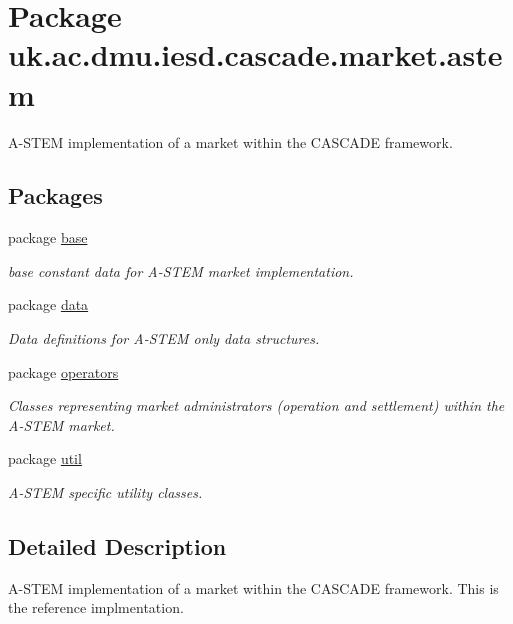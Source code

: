 \hypertarget{namespaceuk_1_1ac_1_1dmu_1_1iesd_1_1cascade_1_1market_1_1astem}{\section{Package uk.\-ac.\-dmu.\-iesd.\-cascade.\-market.\-astem}
\label{namespaceuk_1_1ac_1_1dmu_1_1iesd_1_1cascade_1_1market_1_1astem}
}


A-\/\-S\-T\-E\-M implementation of a market within the C\-A\-S\-C\-A\-D\-E framework.  


\subsection*{Packages}
\begin{DoxyCompactItemize}
\item 
package \hyperlink{namespaceuk_1_1ac_1_1dmu_1_1iesd_1_1cascade_1_1market_1_1astem_1_1base}{base}
\begin{DoxyCompactList}\small\item\em base constant data for A-\/\-S\-T\-E\-M market implementation. \end{DoxyCompactList}\item 
package \hyperlink{namespaceuk_1_1ac_1_1dmu_1_1iesd_1_1cascade_1_1market_1_1astem_1_1data}{data}
\begin{DoxyCompactList}\small\item\em Data definitions for A-\/\-S\-T\-E\-M only data structures. \end{DoxyCompactList}\item 
package \hyperlink{namespaceuk_1_1ac_1_1dmu_1_1iesd_1_1cascade_1_1market_1_1astem_1_1operators}{operators}
\begin{DoxyCompactList}\small\item\em Classes representing market administrators (operation and settlement) within the A-\/\-S\-T\-E\-M market. \end{DoxyCompactList}\item 
package \hyperlink{namespaceuk_1_1ac_1_1dmu_1_1iesd_1_1cascade_1_1market_1_1astem_1_1util}{util}
\begin{DoxyCompactList}\small\item\em A-\/\-S\-T\-E\-M specific utility classes. \end{DoxyCompactList}\end{DoxyCompactItemize}


\subsection{Detailed Description}
A-\/\-S\-T\-E\-M implementation of a market within the C\-A\-S\-C\-A\-D\-E framework. This is the reference implmentation. 